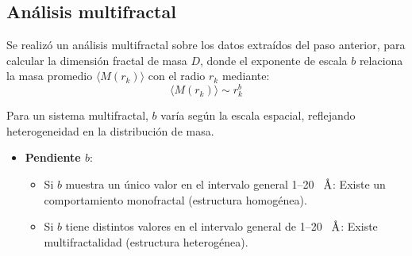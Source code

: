 	

	
	
	\subsection{An\'{a}lisis multifractal}
	
	Se realiz\'{o} un an\'{a}lisis multifractal sobre los datos extra\'{i}dos del paso anterior, para calcular la dimensi\'{o}n fractal de masa $D$, donde el exponente de escala $b$  relaciona la masa  promedio $\langle M(r_{k}) \rangle$ con el radio $r_{k}$ mediante:
	\begin{equation}
		\langle M(r_{k}) \rangle \sim r_{k}^b
	\end{equation}
	
	Para un sistema multifractal, $b$ var\'{i}a seg\'{u}n la escala espacial, reflejando heterogeneidad en la distribuci\'{o}n de masa.
	\begin{itemize}
		\item \textbf{Pendiente $b$}:
		\begin{itemize}
			\item Si $b$ muestra un \'{u}nico valor en el intervalo general 1--20~ $\textup{\r{A}}$: Existe un comportamiento monofractal (estructura homog\'{e}nea).
			\item Si $b$  tiene distintos valores en el intervalo general de 1--20~ $\textup{\r{A}}$: Existe multifractalidad (estructura heterog\'{e}nea).
		\end{itemize}
	\end{itemize}
	
